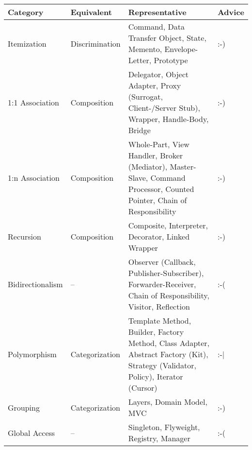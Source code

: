 \begin{table}[ht]
    \begin{center}
        \begin{tabular}{| p{22mm} | p{20mm} | p{23mm} | p{10mm} |}
            \hline
            \textbf{Category} & \textbf{Equivalent} & \textbf{Representative} & \textbf{Advice}\\
            \hline
            Itemization & Discrimination & Command, Data Transfer Object, State, Memento, Envelope-Letter, Prototype & :-)\\
            \hline
            1:1 Association & Composition & Delegator, Object Adapter, Proxy (Surrogat, Client-/Server Stub), Wrapper, Handle-Body, Bridge & :-)\\
            \hline
            1:n Association & Composition & Whole-Part, View Handler, Broker (Mediator), Master-Slave, Command Processor, Counted Pointer, Chain of Responsibility & :-)\\
            \hline
            Recursion & Composition & Composite, Interpreter, Decorator, Linked Wrapper & :-)\\
            \hline
            Bidirectionalism & -- & Observer (Callback, Publisher-Subscriber), Forwarder-Receiver, Chain of Responsibility, Visitor, Reflection & :-(\\
            \hline
            Polymorphism & Categorization & Template Method, Builder, Factory Method, Class Adapter, Abstract Factory (Kit), Strategy (Validator, Policy), Iterator (Cursor) & :-$\mid$\\
            \hline
            Grouping & Categorization & Layers, Domain Model, MVC & :-)\\
            \hline
            Global Access & -- & Singleton, Flyweight, Registry, Manager & :-(\\
            \hline
        \end{tabular}
        \label{pattern_systematics_table}
    \end{center}
\end{table}
